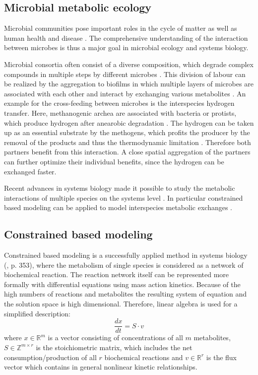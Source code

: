 \subsection{Microbial metabolic ecology}
Microbial communities pose important roles in the cycle of matter \cite{Larsen12} as well as human health and disease \cite{Aziz13}. The comprehensive understanding of the interaction between microbes is thus a major goal in microbial ecology and systems biology. 

Microbial consortia often consist of a diverse composition, which degrade complex compounds in multiple steps by different microbes \cite{Breznak94}. This division of labour can be realized by the aggregation to biofilms in which multiple layers of microbes are associated with each other and interact by exchanging various metabolites \cite{Davey00}. An example for the cross-feeding between microbes is the interspecies hydrogen transfer. Here, methanogenic archea are associated with bacteria or protists, which produce hydrogen after anearobic degradation \cite{Stams94}. The hydrogen can be taken up as an essential substrate by the methogens, which profits the producer by the removal of the products and thus the thermodynamic limitation \cite{Stams94}. Therefore both partners benefit from this interaction. A close spatial aggregation of the partners can further optimize their individual benefits, since the hydrogen can be exchanged faster.

Recent advances in systems biology made it possible to study the metabolic interactions of multiple species on the systems level \cite{Zomorrodi12}. In particular constrained based modeling can be applied to model interspecies metabolic exchanges \cite{Klitgord10}.
 
\subsection{Constrained based modeling}
\label{cobra}
Constrained based modeling is a successfully applied method in systems biology (\cite{Esvelt2013}, \cite{Klipp2010} p. 353), where the metabolism of single species is considered as a network of biochemical reaction.
The reaction network itself can be represented more formally with differential equations using mass action kinetics.
Because of the high numbers of reactions and metabolites the resulting system of equation and the solution space is high dimensional.
Therefore, linear algebra is used for a simplified description:
\[
  \frac{dx}{dt}=S \cdot v
\]
where $x\in \mathbb{R}^m$ is a vector consisting of concentrations of all $m$ metabolites, $S\in \mathbb{Z}^{m\times r}$ is the stoichiometric matrix, which includes the net consumption/production of all $r$ biochemical reactions and $v \in \mathbb{R}^r$ is the flux vector which contains in general nonlinear kinetic relationships.

